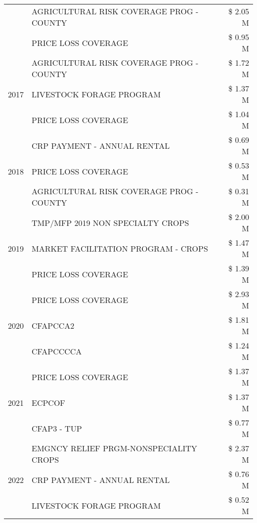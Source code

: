 \begin{tabular}{llr}
 & AGRICULTURAL RISK COVERAGE PROG - COUNTY & \$ 2.05 M \\
 & PRICE LOSS COVERAGE & \$ 0.95 M \\
\cline{1-3}
\multirow[t]{3}{*}{2017} & AGRICULTURAL RISK COVERAGE PROG - COUNTY & \$ 1.72 M \\
 & LIVESTOCK FORAGE PROGRAM & \$ 1.37 M \\
 & PRICE LOSS COVERAGE & \$ 1.04 M \\
\cline{1-3}
\multirow[t]{3}{*}{2018} & CRP PAYMENT - ANNUAL RENTAL & \$ 0.69 M \\
 & PRICE LOSS COVERAGE & \$ 0.53 M \\
 & AGRICULTURAL RISK COVERAGE PROG - COUNTY & \$ 0.31 M \\
\cline{1-3}
\multirow[t]{3}{*}{2019} & TMP/MFP 2019 NON SPECIALTY CROPS & \$ 2.00 M \\
 & MARKET FACILITATION PROGRAM - CROPS & \$ 1.47 M \\
 & PRICE LOSS COVERAGE & \$ 1.39 M \\
\cline{1-3}
\multirow[t]{3}{*}{2020} & PRICE LOSS COVERAGE & \$ 2.93 M \\
 & CFAPCCA2 & \$ 1.81 M \\
 & CFAPCCCCA & \$ 1.24 M \\
\cline{1-3}
\multirow[t]{3}{*}{2021} & PRICE LOSS COVERAGE & \$ 1.37 M \\
 & ECPCOF & \$ 1.37 M \\
 & CFAP3 - TUP & \$ 0.77 M \\
\cline{1-3}
\multirow[t]{3}{*}{2022} & EMGNCY RELIEF PRGM-NONSPECIALITY CROPS & \$ 2.37 M \\
 & CRP PAYMENT - ANNUAL RENTAL & \$ 0.76 M \\
 & LIVESTOCK FORAGE PROGRAM & \$ 0.52 M \\
\cline{1-3}
\bottomrule
\end{tabular}
